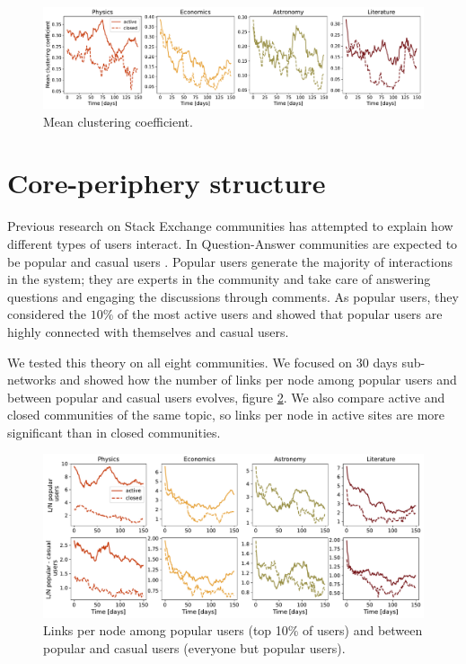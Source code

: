 \begin{figure}
	\centering
	\includegraphics[width=\linewidth]{figures/stackexchange/clustering.pdf}%
	\caption{Mean clustering coefficient.}
	\label{fig:clustering}
\end{figure}

\section{Core-periphery structure}

Previous research on Stack Exchange communities has attempted to explain how different types of users interact. In Question-Answer communities are expected to be popular and casual users \cite{santos2019activity, santos2019self}. Popular users generate the majority of interactions in the system; they are experts in the community and take care of answering questions and engaging the discussions through comments. As popular users, they considered the $10 \%$ of the most active users and showed that popular users are highly connected with themselves and casual users.

We tested this theory on all eight communities. We focused on 30 days sub-networks and showed how the number of links per node among popular users and between popular and casual users evolves, figure \ref{fig:pop_cas_users}. We also compare active and closed communities of the same topic, so links per node in active sites are more significant than in closed communities.

\begin{figure}[h!]
	\centering
	\includegraphics[width=\linewidth]{figures/stackexchange/popular_casual_users.pdf}
	\caption[Number of links per node]{Links per node among popular users (top 10\% of users) and between popular and casual users (everyone but popular users).}
	\label{fig:pop_cas_users}
\end{figure} 

